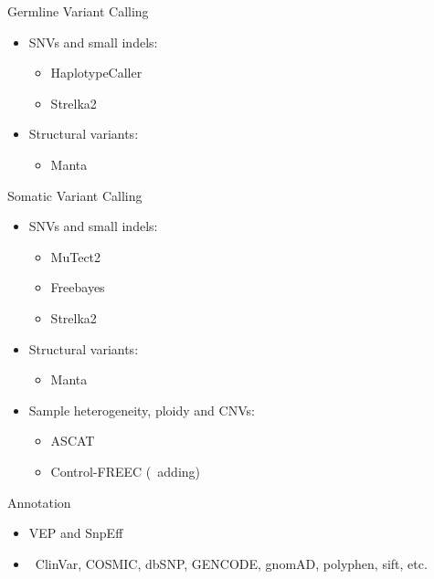 \documentclass[usepdftitle=false]{beamer}
\begin{document}
\begin{frame}{Germline Variant Calling}
	\begin{itemize}
		\item SNVs and small indels:
		\pause
	\begin{itemize}
			\item HaplotypeCaller
			\item Strelka2
		\end{itemize}
		\pause
		\item Structural variants:
		\pause
		\begin{itemize}
			\item Manta
		\end{itemize}
	\end{itemize}
\end{frame}

\begin{frame}{Somatic Variant Calling}
	\begin{itemize}
		\item SNVs and small indels:
		\pause
		\begin{itemize}
			\item MuTect2
			\item Freebayes
			\item Strelka2
		\end{itemize}
		\pause
		\item Structural variants:
		\pause
		\begin{itemize}
			\item Manta
		\end{itemize}
		\pause
		\item Sample heterogeneity, ploidy and CNVs:
		\pause
		\begin{itemize}
			\item ASCAT
			\item Control-FREEC (\faWrench\ adding)
		\end{itemize}
	\end{itemize}
\end{frame}

\begin{frame}{Annotation}
	\begin{itemize}
		\item VEP and SnpEff
		\pause
		\item \faDatabase\ ClinVar, COSMIC, dbSNP, GENCODE, gnomAD, polyphen, sift, etc.
	\end{itemize}
\end{frame}
\end{document}
